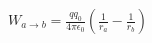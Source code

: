 \documentclass[preview]{standalone}
\begin{document}
\begin{align*}
W_{a \rightarrow b} = \frac{q q_0}{4 \pi \epsilon_0} \left( \frac{1}{r_a} - \frac{1}{r_b} \right)
\end{align*}
\end{document}
